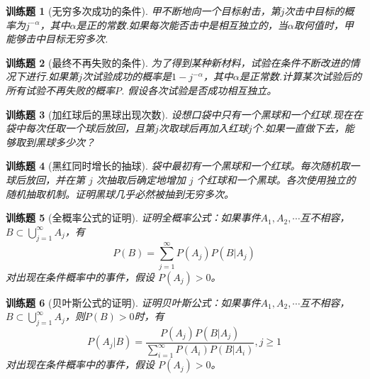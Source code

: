 \documentclass[UTF8,12pt,a4paper,fontset=fandol]{ctexbook}
\newtheorem{exercise}{训练题}[section]
\begin{document}
\begin{exercise}[无穷多次成功的条件]\label{q:Y2.26}
甲不断地向一个目标射击，第$j$次击中目标的概率为$j^{-\alpha}$，其中$\alpha$是正的常数.如果每次能否击中是相互独立的，当$\alpha$取何值时，甲能够击中目标无穷多次.\par{}\end{exercise}

\begin{exercise}[最终不再失败的条件]\label{q:Y2.27}
为了得到某种新材料，试验在条件不断改进的情况下进行.如果第$j$次试验成功的概率是$1-j^{-\alpha}$，其中$\alpha$是正常数.计算某次试验后的所有试验不再失败的概率$P$. 假设各次试验是否成功相互独立。\par{}\end{exercise}

\begin{exercise}[加红球后的黑球出现次数]\label{q:Y2.28}
设想口袋中只有一个黑球和一个红球.现在在袋中每次任取一个球后放回，且第$j$次取球后再加入红球$j$个.如果一直做下去，能够取到黑球多少次？\par{}\end{exercise}

\begin{exercise}[黑红同时增长的抽球]\label{q:Y2.29}
袋中最初有一个黑球和一个红球。每次随机取一球后放回，并在第 $j$ 次抽取后确定地增加 $j$ 个红球和一个黑球。各次使用独立的随机抽取机制。证明黑球几乎必然被抽到无穷多次。\par{}\end{exercise}

\begin{exercise}[全概率公式的证明]\label{q:Y2.30}
证明全概率公式：如果事件$A_1,A_2,\cdots$互不相容，$B\subset \bigcup\limits_{j = 1}^\infty  {{A_j}} $，有
\[P(B) = \sum\limits_{j = 1}^\infty  {P({A_j})P(B|{A_j})} \] 对出现在条件概率中的事件，假设 $P(A_j)>0$。\par{}\end{exercise}

\begin{exercise}[贝叶斯公式的证明]\label{q:Y2.31}
证明贝叶斯公式：如果事件$A_1,A_2,\cdots$互不相容，$B\subset \bigcup\limits_{j = 1}^\infty  {{A_j}} $，则$P(B)>0$时，有
\[P({A_j}|B) = \frac{{P({A_j})P(B|{A_j})}}{{\sum\limits_{i = 1}^\infty  {P({A_i})P(B|{A_i})} }},j \geqslant 1\] 对出现在条件概率中的事件，假设 $P(A_j)>0$。\par{}\end{exercise}
\end{document}
